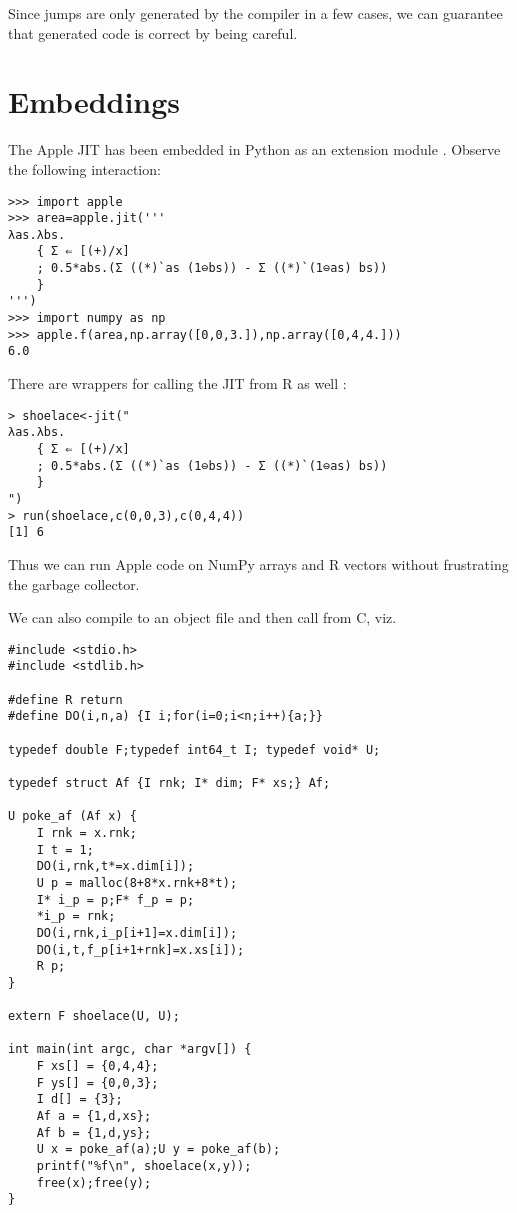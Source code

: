 \documentclass[sigplan,screen,anonymous]{acmart}
\begin{document}
Since jumps are only generated by the compiler in a few cases, we can guarantee that generated code is correct by being careful.

\section{Embeddings}

The Apple JIT has been embedded in Python as an extension module \cite{pythonext}. Observe the following interaction:

\begin{verbatim}
>>> import apple
>>> area=apple.jit('''
λas.λbs.
    { Σ ⇐ [(+)/x]
    ; 0.5*abs.(Σ ((*)`as (1⊖bs)) - Σ ((*)`(1⊖as) bs))
    }
''')
>>> import numpy as np
>>> apple.f(area,np.array([0,0,3.]),np.array([0,4,4.]))
6.0
\end{verbatim}

There are wrappers for calling the JIT from R as well \cite{wickham}:

\begin{verbatim}
> shoelace<-jit("
λas.λbs.
    { Σ ⇐ [(+)/x]
    ; 0.5*abs.(Σ ((*)`as (1⊖bs)) - Σ ((*)`(1⊖as) bs))
    }
")
> run(shoelace,c(0,0,3),c(0,4,4))
[1] 6
\end{verbatim}

Thus we can run Apple code on NumPy arrays and R vectors without frustrating the garbage collector.

We can also compile to an object file and then call from C, viz.

\begin{verbatim}
#include <stdio.h>
#include <stdlib.h>

#define R return
#define DO(i,n,a) {I i;for(i=0;i<n;i++){a;}}

typedef double F;typedef int64_t I; typedef void* U;

typedef struct Af {I rnk; I* dim; F* xs;} Af;

U poke_af (Af x) {
    I rnk = x.rnk;
    I t = 1;
    DO(i,rnk,t*=x.dim[i]);
    U p = malloc(8+8*x.rnk+8*t);
    I* i_p = p;F* f_p = p;
    *i_p = rnk;
    DO(i,rnk,i_p[i+1]=x.dim[i]);
    DO(i,t,f_p[i+1+rnk]=x.xs[i]);
    R p;
}

extern F shoelace(U, U);

int main(int argc, char *argv[]) {
    F xs[] = {0,4,4};
    F ys[] = {0,0,3};
    I d[] = {3};
    Af a = {1,d,xs};
    Af b = {1,d,ys};
    U x = poke_af(a);U y = poke_af(b);
    printf("%f\n", shoelace(x,y));
    free(x);free(y);
}
\end{verbatim}
\end{document}
